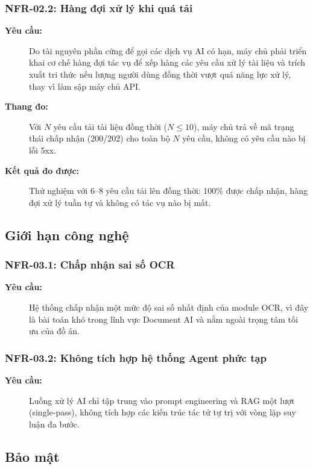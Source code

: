 \subsubsection{NFR-02.2: Hàng đợi xử lý khi quá tải}
\begin{description}
    \item[\textbf{Yêu cầu:}] Do tài nguyên phần cứng để gọi các dịch vụ AI có hạn, máy chủ phải triển khai cơ chế hàng đợi tác vụ để xếp hàng các yêu cầu xử lý tài liệu và trích xuất tri thức nếu lượng người dùng đồng thời vượt quá năng lực xử lý, thay vì làm sập máy chủ API.
    \item[\textbf{Thang đo:}] Với $N$ yêu cầu tải tài liệu đồng thời ($N \le 10$), máy chủ trả về mã trạng thái chấp nhận (200/202) cho toàn bộ $N$ yêu cầu, không có yêu cầu nào bị lỗi 5xx.
    \item[\textbf{Kết quả đo được:}] Thử nghiệm với 6--8 yêu cầu tải lên đồng thời: 100\% được chấp nhận, hàng đợi xử lý tuần tự và không có tác vụ nào bị mất.
\end{description}

\subsection{Giới hạn công nghệ}
\subsubsection{NFR-03.1: Chấp nhận sai số OCR}
\begin{description}
    \item[\textbf{Yêu cầu:}] Hệ thống chấp nhận một mức độ sai số nhất định của module OCR, vì đây là bài toán khó trong lĩnh vực Document AI và nằm ngoài trọng tâm tối ưu của đồ án.
\end{description}
\subsubsection{NFR-03.2: Không tích hợp hệ thống Agent phức tạp}
\begin{description}
    \item[\textbf{Yêu cầu:}] Luồng xử lý AI chỉ tập trung vào prompt engineering và RAG một lượt (single-pass), không tích hợp các kiến trúc tác tử tự trị với vòng lặp suy luận đa bước.
\end{description}

\subsection{Bảo mật}
